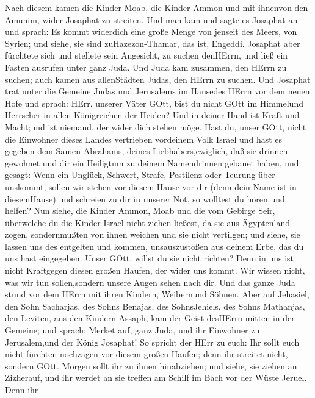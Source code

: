  Nach diesem kamen die Kinder Moab, die Kinder Ammon und mit
ihnenvon den Amunim, wider Josaphat zu streiten.  Und man
kam und sagte es Josaphat an und sprach: Es kommt widerdich eine große
Menge von jenseit des Meers, von Syrien; und siehe, sie sind
zuHazezon-Thamar, das ist, Engeddi.  Josaphat aber fürchtete
sich und stellete sein Angesicht, zu suchen denHErrn, und ließ ein
Fasten ausrufen unter ganz Juda.  Und Juda kam zusammen, den
HErrn zu suchen; auch kamen aus allenStädten Judas, den HErrn zu suchen.
 Und Josaphat trat unter die Gemeine Judas und Jerusalems im
Hausedes HErrn vor dem neuen Hofe  und sprach: HErr, unserer
Väter GOtt, bist du nicht GOtt im Himmelund Herrscher in allen
Königreichen der Heiden? Und in deiner Hand ist Kraft und Macht;und ist
niemand, der wider dich stehen möge.  Hast du, unser GOtt,
nicht die Einwohner dieses Landes vertrieben vordeinem Volk Israel und
hast es gegeben dem Samen Abrahams, deines Liebhabers,ewiglich,
 daß sie drinnen gewohnet und dir ein Heiligtum zu deinem
Namendrinnen gebauet haben, und gesagt:  Wenn ein Unglück,
Schwert, Strafe, Pestilenz oder Teurung über unskommt, sollen wir stehen
vor diesem Hause vor dir (denn dein Name ist in diesemHause) und
schreien zu dir in unserer Not, so wolltest du hören und helfen?
 Nun siehe, die Kinder Ammon, Moab und die vom Gebirge
Seir, überwelche du die Kinder Israel nicht ziehen ließest, da sie aus
Ägyptenland zogen, sondernmußten von ihnen weichen und sie nicht
vertilgen;  und siehe, sie lassen uns des entgelten und
kommen, unsauszustoßen aus deinem Erbe, das du uns hast eingegeben.
 Unser GOtt, willst du sie nicht richten? Denn in uns ist
nicht Kraftgegen diesen großen Haufen, der wider uns kommt. Wir wissen
nicht, was wir tun sollen,sondern unsere Augen sehen nach dir.
 Und das ganze Juda stund vor dem HErrn mit ihren Kindern,
Weibernund Söhnen.  Aber auf Jehasiel, den Sohn Sacharjas,
des Sohns Benajas, des SohnsJehiels, des Sohns Mathanjas, den Leviten,
aus den Kindern Assaph, kam der Geist desHErrn mitten in der Gemeine;
 und sprach: Merket auf, ganz Juda, und ihr Einwohner zu
Jerusalem,und der König Josaphat! So spricht der HErr zu euch: Ihr sollt
euch nicht fürchten nochzagen vor diesem großen Haufen; denn ihr
streitet nicht, sondern GOtt.  Morgen sollt ihr zu ihnen
hinabziehen; und siehe, sie ziehen an Zizherauf, und ihr werdet an sie
treffen am Schilf im Bach vor der Wüste Jeruel.  Denn ihr
